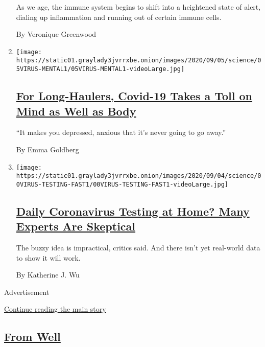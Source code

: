\begin{enumerate}
  As we age, the immune system begins to shift into a heightened state
  of alert, dialing up inflammation and running out of certain immune
  cells.

  By Veronique Greenwood
\item
  \texttt{[image: https://static01.graylady3jvrrxbe.onion/images/2020/09/05/science/05VIRUS-MENTAL1/05VIRUS-MENTAL1-videoLarge.jpg]}

  \hypertarget{for-long-haulers-covid-19-takes-a-toll-on-mind-as-well-as-body}{%
  \subsection{\texorpdfstring{\href{/2020/09/07/health/coronavirus-mental-health-long-hauler.html}{For
  Long-Haulers, Covid-19 Takes a Toll on Mind as Well as
  Body}}{For Long-Haulers, Covid-19 Takes a Toll on Mind as Well as Body}}\label{for-long-haulers-covid-19-takes-a-toll-on-mind-as-well-as-body}}

  ``It makes you depressed, anxious that it's never going to go away.''

  By Emma Goldberg
\item
  \texttt{[image: https://static01.graylady3jvrrxbe.onion/images/2020/09/04/science/00VIRUS-TESTING-FAST1/00VIRUS-TESTING-FAST1-videoLarge.jpg]}

  \hypertarget{daily-coronavirus-testing-at-home-many-experts-are-skeptical}{%
  \subsection{\texorpdfstring{\href{/2020/09/06/health/coronavirus-rapid-test.html}{Daily
  Coronavirus Testing at Home? Many Experts Are
  Skeptical}}{Daily Coronavirus Testing at Home? Many Experts Are Skeptical}}\label{daily-coronavirus-testing-at-home-many-experts-are-skeptical}}

  The buzzy idea is impractical, critics said. And there isn't yet
  real-world data to show it will work.

  By Katherine J. Wu
\end{enumerate}

Advertisement

\protect\hyperlink{after-mid1}{Continue reading the main story}

\hypertarget{from-well}{%
\subsection{\texorpdfstring{\href{/section/well}{From
Well}}{From Well}}\label{from-well}}

